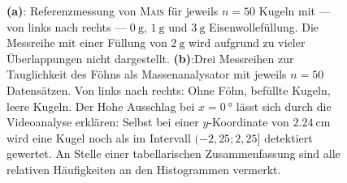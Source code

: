 \begin{figure}[htb!p]
{}
  \caption[Aufspaltung mit Föhn als Analysator]{
  {\color{mycolor}\textbf{(a)}:} Referenzmessung von \textsc{Mais} für jeweils $n=50$ Kugeln mit --- von links nach rechts --- $\SI{0}{\gram}$, $\SI{1}{\gram}$ und $\SI{3}{\gram}$ Eisenwollefüllung. Die Messreihe mit einer Füllung von $\SI{2}{\gram}$ wird aufgrund zu vieler Überlappungen nicht dargestellt.
   {\color{mycolor}\textbf{(b)}:}Drei Messreihen zur Tauglichkeit des Föhns als Massenanalysator mit jeweils $n=50$ Datensätzen. Von links nach rechts: Ohne Föhn, befüllte Kugeln, leere Kugeln. Der Hohe Ausschlag bei $x=\SI{0}{\degree}$ lässt sich durch die Videoanalyse erklären: Selbst bei einer $y$-Koordinate von $\SI{2.24}{\centi\metre}$ wird eine Kugel noch als im Intervall $(-2,25; 2,25]$ detektiert gewertet. An Stelle einer tabellarischen Zusammenfassung sind alle relativen Häufigkeiten an den Histogrammen vermerkt.}
  \label{fig:maisbex}
  \vspace{-0pt}
\end{figure}